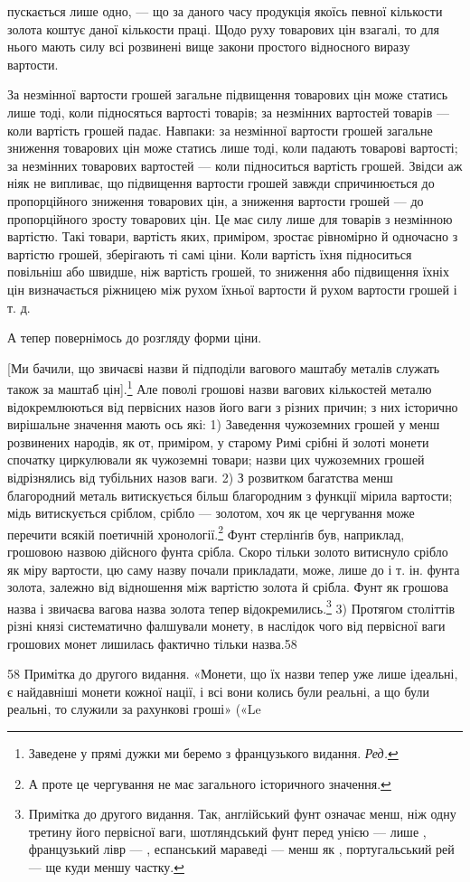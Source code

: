 пускається лише одно, — що за даного часу продукція якоїсь певної
кількости золота коштує даної кількости праці. Щодо руху
товарових цін взагалі, то для нього мають силу всі розвинені
вище закони простого відносного виразу вартости.

За незмінної вартости грошей загальне підвищення товарових
цін може статись лише тоді, коли підносяться вартості товарів;
за незмінних вартостей товарів — коли вартість грошей
падає. Навпаки: за незмінної вартости грошей загальне зниження
товарових цін може статись лише тоді, коли падають
товарові вартості; за незмінних товарових вартостей — коли
підноситься вартість грошей. Звідси аж ніяк не випливає, що
підвищення вартости грошей завжди спричинюється до пропорційного
зниження товарових цін, а зниження вартости грошей —
до пропорційного зросту товарових цін. Це має силу лише для
товарів з незмінною вартістю. Такі товари, вартість яких, приміром,
зростає рівномірно й одночасно з вартістю грошей, зберігають
ті самі ціни. Коли вартість їхня підноситься повільніш
або швидше, ніж вартість грошей, то зниження або підвищення
їхніх цін визначається ріжницею між рухом їхньої вартости й
рухом вартости грошей і т. д.

А тепер повернімось до розгляду форми ціни.

[Ми бачили, що звичаєві назви й підподіли вагового маштабу
металів служать також за маштаб цін].\footnote*{
Заведене у прямі дужки ми беремо з французького видання. \emph{Ред.}
} Але поволі грошові
назви вагових кількостей металю відокремлюються від первісних
назов його ваги з різних причин; з них історично вирішальне
значення мають ось які: 1) Заведення чужоземних грошей у
менш розвинених народів, як от, приміром, у старому Римі
срібні й золоті монети спочатку циркулювали як чужоземні
товари; назви цих чужоземних грошей відрізнялись від тубільних
назов ваги. 2) З розвитком багатства менш благородний
металь витискується більш благородним з функції мірила вартости;
мідь витискується сріблом, срібло — золотом, хоч як це
чергування може перечити всякій поетичній хронології.\footnote{
А проте це чергування не має загального історичного значення.
} Фунт
стерлінґів був, наприклад, грошовою назвою дійсного фунта
срібла. Скоро тільки золото витиснуло срібло як міру вартости,
цю саму назву почали прикладати, може, лише до  і т. ін. фунта
золота, залежно від відношення між вартістю золота й
срібла. Фунт як грошова назва і звичаєва вагова назва золота
тепер відокремились.\footnote{
Примітка до другого видання. Так, англійський фунт означає
менш, ніж одну третину його первісної ваги, шотляндський фунт перед
унією — лише , французький лівр — , еспанський мараведі — менш
як , португальський рей — ще куди меншу частку.
} 3) Протягом століттів різні князі систематично
фалшували монету, в наслідок чого від первісної ваги
грошових монет лишилась фактично тільки назва.58

58 Примітка до другого видання. «Монети, що їх назви тепер уже
лише ідеальні, є найдавніші монети кожної нації, і всі вони колись
були реальні, а що були реальні, то служили за рахункові гроші» («Le